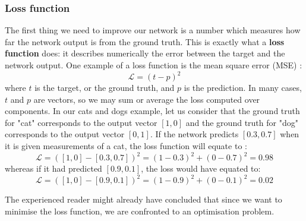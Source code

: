 \subsubsection{Loss function}
The first thing we need to improve our network is a number which measures
how far the network output is from the ground truth.
This is exactly what a \textbf{loss function}  does: 
it describes numerically the error between the target and the network output.
One example of a loss function is the mean square error (MSE) :
$$ \mathcal{L} = (t-p)^2$$
where $t$ is the target, or the ground truth, and $p$ is the prediction. In
many cases, $t$ and $p$ are vectors, so we may sum or average the loss computed
over components.
In our cats and dogs example, let us consider that the ground truth for
"cat" corresponds to the output vector $[1, 0]$ and the ground truth for "dog"
corresponds to the output vector $[0, 1]$. If the network predicts $[0.3, 0.7]$
when it is given measurements of a cat, the loss function will equate to :
$$ \mathcal{L} = ([1, 0]-[0.3, 0.7])^2 = (1-0.3)^2 + (0-0.7)^2 = 0.98$$
whereas if it had predicted $[0.9, 0.1]$, the loss would have equated to:
$$ \mathcal{L} = ([1, 0]-[0.9, 0.1])^2 = (1-0.9)^2 + (0-0.1)^2 = 0.02$$

The experienced reader might already have concluded that since we want to
minimise the loss function, we are confronted to an optimisation problem.

